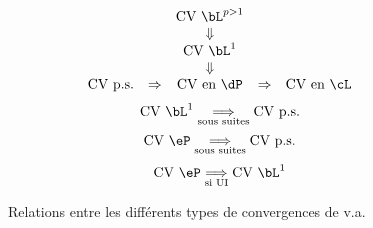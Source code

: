\begin{figure}[htbp] 
 $$
 \begin{array}[c]{ccccc}
 &&\text{CV }\bL^{p>1}&&\\
 &&\Downarrow&&\\
 &&\text{CV }\bL^1&&\\
 &&\Downarrow&&\\
 \text{CV p.s.}
 &\Rightarrow
 &\text{CV en } \dP
 &\Rightarrow
 &\text{CV en } \cL
 \end{array}
 $$
 $$
 \text{CV } \bL^1 \underset{\text{sous suites}}{\Longrightarrow}\text{CV p.s.}
 $$
 $$
 \text{CV } \eP \underset{\text{sous suites}}{\Longrightarrow}\text{CV p.s.}
 $$
 $$
 \text{CV } \eP \underset{\text{si UI}}{\Longrightarrow}\text{CV } \bL^1
 $$
 \caption{Relations entre les différents types de convergences de v.a.}
 \label{tab:convergences}
\end{figure}

